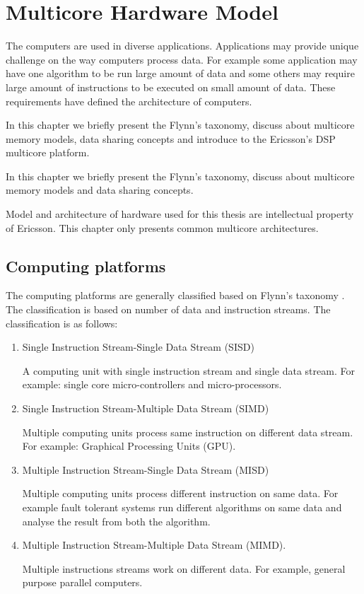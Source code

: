 \chapter{Multicore Hardware Model}

The computers are used in diverse applications. Applications may provide unique challenge on the way computers process data. For example some application may have one algorithm to be run large amount of data and some others may require large amount of instructions to be executed on small amount of data. These requirements have defined the architecture of computers.
\ifericsson

In this chapter we briefly present the Flynn's taxonomy, discuss about multicore memory models, data sharing concepts and introduce to the Ericsson's DSP multicore platform.
\else

In this chapter we briefly present the Flynn's taxonomy, discuss about multicore memory models and data sharing concepts.

Model and architecture of hardware used for this thesis are intellectual property of Ericsson. This chapter only presents common multicore architectures.
\fi


\section{Computing platforms}

The computing platforms are generally classified based on Flynn's taxonomy \cite{flynn1966very}. The classification is based on number of data and instruction streams. The classification is as follows: 

\begin{enumerate}
\item{Single Instruction Stream-Single Data Stream (SISD)}

A computing unit with single instruction stream and single data stream. For example: single core micro-controllers and micro-processors.

\item{Single Instruction Stream-Multiple Data Stream (SIMD)}

Multiple computing units process same instruction on different data stream. For example: Graphical Processing Units (GPU).

\item{Multiple Instruction Stream-Single Data Stream (MISD)}

Multiple computing units process different instruction on same data. For example fault tolerant systems run different algorithms on same data and analyse the result from both the algorithm.

\item{Multiple Instruction Stream-Multiple Data Stream (MIMD)}.

Multiple instructions streams work on different data. For example, general purpose parallel computers.

\end{enumerate}

